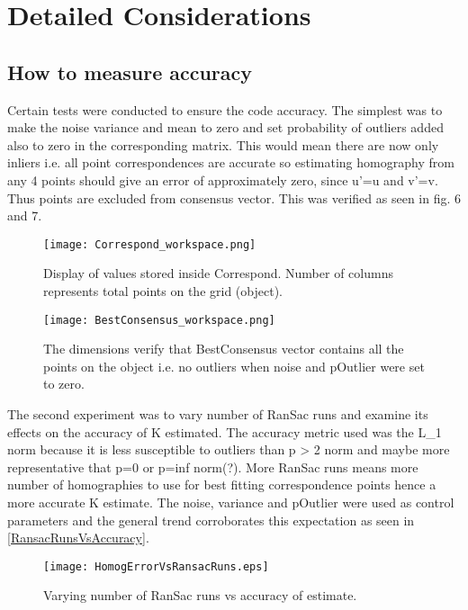 \documentclass[titlepage]{article}
\begin{document}
\section{Detailed Considerations}
\subsection{How to measure accuracy}
Certain tests were conducted to ensure the code accuracy. The simplest was to make the noise variance and mean to zero and set probability of outliers added also to zero in the corresponding matrix. This would mean there are now only inliers i.e. all point correspondences are accurate so estimating homography from any 4 points should give an error of approximately zero, since u’=u and v’=v. Thus  points are excluded from consensus vector. This was verified as seen in fig. 6 and 7.
\begin{wrapfigure}{r}{5.5cm}
\caption{Display of values stored inside Correspond. Number of columns represents total points on the grid (object).}\label{wrap-fig:1}
\texttt{[image: Correspond\_workspace.png]}
\end{wrapfigure} 
\begin{wrapfigure}{r}{5.5cm}
\caption{The dimensions verify that BestConsensus vector contains all the points on the object i.e. no outliers when noise and pOutlier were set to zero.}\label{wrap-fig:1}
\texttt{[image: BestConsensus\_workspace.png]}
\end{wrapfigure}
The second experiment was to vary number of RanSac runs and examine its effects on the accuracy of K estimated. The accuracy metric used was the L_1 norm because it is less susceptible to outliers than p > 2 norm and maybe more representative that p=0 or p=inf norm(?). More RanSac  runs means more number of homographies to use for best fitting correspondence points hence a more accurate K estimate. The noise, variance and pOutlier were used as control parameters and the general trend corroborates this expectation as seen in \ref{RansacRunsVsAccuracy}.
\begin{wrapfigure}{l}{5.5cm}
\label{RansacRunsVsAccuracy}
\caption{Varying number of RanSac runs vs accuracy of estimate.}\label{wrap-fig:1}
\texttt{[image: HomogErrorVsRansacRuns.eps]}
\end{wrapfigure} 
\end{document}

